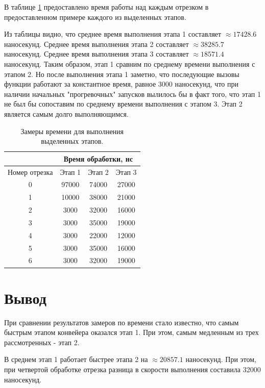\documentclass[12pt]{report}
\begin{document}
В таблице \ref{time1} предоставлено время работы над каждым отрезком в предоставленном примере каждого из выделенных этапов.

Из таблицы видно, что среднее время выполнения этапа 1 составляет $\approx 17428.6$ наносекунд. Среднее время выполнения этапа 2 составляет $\approx 38285.7$ наносекунд. Среднее время выполнения этапа 3 составляет $\approx 18571.4$ наносекунд. Таким образом, этап 1 сравним по среднему времени выполнения с этапом 2. Но после выполнения этапа 1 заметно, что последующие вызовы функции работают за константное время, равное 3000 наносекунд, что при наличии начальных "прогревочных" запусков вылилось бы в факт того, что этап 1 не был бы сопоставим по среднему времени выполнения с этапом 3. Этап 2 является самым долго выполняющимся.

\begin{table}[h]
	\begin{center}
		\caption{\label{time1} Замеры времени для выполнения выделенных этапов.}
		\begin{tabular}{|c |c |c |c|} 
 			\hline
 			&\multicolumn{3}{|c|}{Время обработки, нс}\\
 			\hline
			Номер отрезка & Этап 1 & Этап 2 & Этап 3\\ [0.5ex] 
 			\hline\hline
 			0 & 97000 & 74000 & 27000 \\
 			\hline
 			1 & 10000 & 38000 & 21000 \\
 			\hline
			2 & 3000 & 32000 & 16000 \\
			\hline
			3 & 3000 & 35000 & 19000 \\
			\hline
			4 & 3000 & 22000 & 12000 \\
			\hline
			5 & 3000 & 35000 & 16000 \\
			\hline
			6 & 3000 & 32000 & 19000 \\
			\hline
			\end{tabular}
	\end{center}
\end{table}

\newpage

\section*{Вывод}
При сравнении результатов замеров по времени стало известно, что самым быстрым этапом конвейера оказался этап 1. При этом, самым медленным из трех рассмотренных - этап 2.

В среднем этап 1 работает быстрее этапа 2 на $\approx 20857.1$ наносекунд. При этом, при четвертой обработке отрезка разница в скорости выполнения составила 32000 наносекунд.
\end{document}
